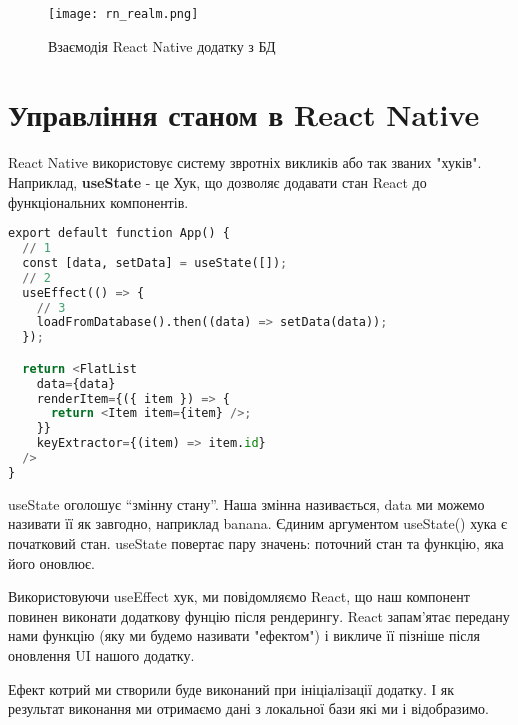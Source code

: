 \begin{figure}
    \label{fig:rn_realm}
    \begin{center}
        \texttt{[image: rn\_realm.png]}
    \end{center}

    Взаємодія React Native додатку з БД
\end{figure}


\section{Управління станом в React Native}
\label{section.2.8}
React Native використовує систему звротніх викликів або так званих "хуків".
Наприклад, \textbf{useState} - це Хук, що дозволяє додавати стан React до функціональних компонентів.

\begin{lstlisting}[style=light, language=Python,label={lst:rn_state_hooks},caption=React Native Hooks]
export default function App() {
  // 1
  const [data, setData] = useState([]);
  // 2
  useEffect(() => {
    // 3
    loadFromDatabase().then((data) => setData(data));
  });

  return <FlatList
    data={data}
    renderItem={({ item }) => {
      return <Item item={item} />;
    }}
    keyExtractor={(item) => item.id}
  />
}
\end{lstlisting}

\begin{enumerate}
    \begin{item}
        useState оголошує “змінну стану”.
        Наша змінна називається, data ми можемо називати її як завгодно, наприклад banana.
        Єдиним аргументом useState() хука є початковий стан.
        useState повертає пару значень: поточний стан та функцію, яка його оновлює.
    \end{item}
    \begin{item}
        Використовуючи useEffect хук, ми повідомляємо React, що наш компонент повинен виконати додаткову фунцію після рендерингу.
        React запам'ятає передану нами функцію (яку ми будемо називати "ефектом") і викличе її пізніше після оновлення UI нашого додатку.
    \end{item}
    \begin{item}
        Ефект котрий ми створили буде виконаний при ініціалізації додатку.
        І як результат виконання ми отримаємо дані з локальної бази які ми і відобразимо.
    \end{item}
\end{enumerate}

